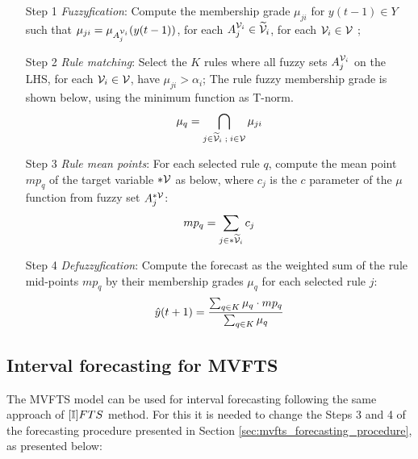 \begin{enumerate}
\item [Step 1] \textit{Fuzzyfication}: Compute the membership grade $\mu_{ji}$ for $y(t-1) \in Y$ such that $\mu_{ji} = \mu_{A_j^{\mathcal{V}_i}}(y(t-1))$, for each $A_j^{\mathcal{V}_i} \in \widetilde{\mathcal{V}}_i$, for each $\mathcal{V}_i \in \mathcal{V}$ ;
\item [Step 2] \textit{Rule matching}: Select the $K$ rules where all fuzzy sets $A_j^{\mathcal{V}_i}$ on the LHS, for each $\mathcal{V}_i \in \mathcal{V}$, have $\mu_{ji} > \alpha_i$; The rule fuzzy membership grade is shown below, using the minimum function as T-norm.
\begin{equation}
    \mu_q = \bigcap_{j \in \widetilde{\mathcal{V}}_i\; ; \; i \in \mathcal{V}} \mu_{ji}
\end{equation}
\item [Step 3] \textit{Rule mean points}: For each selected rule $q$, compute the mean point $mp_q$ of the target variable $*\mathcal{V}$ as below, where $c_j$ is the $c$ parameter of the $\mu$ function from fuzzy set $A_j^{*\mathcal{V}}$:
\begin{equation}
mp_q = \sum_{j \in *\widetilde{\mathcal{V}}_i} c_j
\end{equation}
\item [Step 4] \textit{Defuzzyfication}: Compute the forecast as the weighted sum of the rule mid-points $mp_q$ by their membership grades $\mu_q$ for each selected rule $j$:
\begin{equation}
\hat{y}(t+1) = \frac{\sum_{q \in K} \mu_q \cdot mp_q}{\sum_{q \in K} \mu_q}
\end{equation}
\end{enumerate}

\subsection{Interval forecasting for MVFTS}
\label{sec:mvfts_interval}

The MVFTS model can be used for interval forecasting following the same approach of $[\mathbb{I}]FTS$ method. For this it is needed to change the Steps 3 and 4 of the forecasting procedure presented in Section \ref{sec:mvfts_forecasting_procedure}, as presented below:

